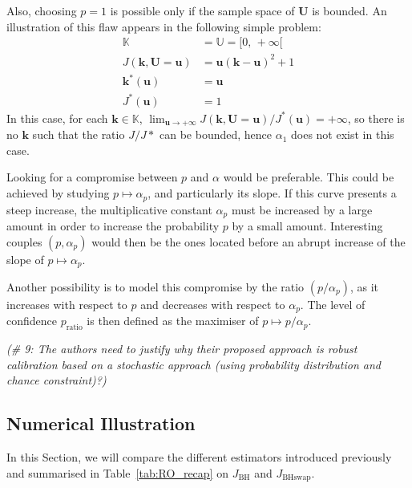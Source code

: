 \documentclass[preprint, review, 1p]{elsarticle}
\newcommand{\checkap}{{\alpha}_p}
\newcommand{\checka}{{\alpha}}
\newcommand{\Kspace}{\mathbb{K}}
\newcommand{\Uspace}{\mathbb{U}}
\newcommand{\JBH}{J_{\mathrm{BH}}}
\newcommand{\JBHS}{J_{\mathrm{BHswap}}}
\newcommand{\victor}[1]{{\itshape\color{green} ({#1})}}
\begin{document}
Also, choosing $p=1$ is possible only if the sample space of $\mathbf{U}$ is bounded. An illustration of this flaw appears in the following simple problem:
\begin{align*}
  \label{eq:Jinfinite}
  \Kspace &= \Uspace = [0,\,+\infty[ \\
  J(\mathbf{k},\mathbf{U}=\mathbf{u}) &= \mathbf{u}(\mathbf{k}-\mathbf{u})^2 + 1 \\
  \mathbf{k}^*(\mathbf{u}) &= \mathbf{u} \\
  J^*(\mathbf{u}) &= 1
\end{align*}
In this case, for each $\mathbf{k}\in \Kspace$, $\lim_{\mathbf{u} \rightarrow + \infty} {J(\mathbf{k},\mathbf{U}=\mathbf{u})/J^*(\mathbf{u})} = + \infty$, so there is no $\mathbf{k}$ such that the ratio $J/J *$ can be bounded, hence $\alpha_1$ does not exist in this case.


Looking for a compromise between $p$ and $\alpha$ would be preferable. This could be achieved by studying $p \mapsto \checkap$, and particularly its slope.
If this curve presents a steep increase, the multiplicative constant $\checkap$ must be increased by a large amount in order to increase the probability $p$ by a small amount. Interesting couples $(p,\checkap)$ would then be the ones located before an abrupt increase of the slope of $p \mapsto \checkap$.

Another possibility is to model this compromise by the ratio $(p/\checkap)$, as it increases with respect to $p$ and decreases with respect to $\checka_p$. The level of confidence $p_{\mathrm{ratio}}$ is then defined as the maximiser of $p\mapsto p / \checka_p$.






\victor{\# 9: The authors need to justify why their proposed approach is robust calibration based on a stochastic approach (using probability distribution and chance constraint)?}
\subsection{Numerical Illustration}
\label{ssec:numerical_illustration}

In this Section, we will compare the different estimators introduced previously and summarised in Table~\ref{tab:RO_recap} on $\JBH$ and $\JBHS$.
\end{document}
